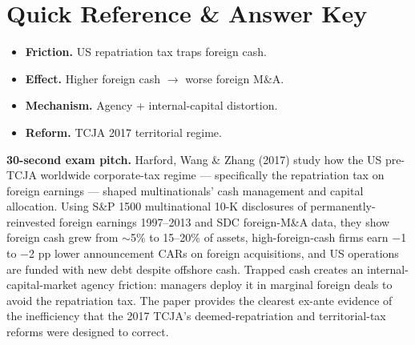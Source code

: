 \documentclass[11pt]{article}
\begin{document}
\section*{Quick Reference \& Answer Key}
\begin{answerbox}
\begin{itemize}
\item \textbf{Friction.} US repatriation tax traps foreign cash.
\item \textbf{Effect.} Higher foreign cash $\to$ worse foreign M\&A.
\item \textbf{Mechanism.} Agency + internal-capital distortion.
\item \textbf{Reform.} TCJA 2017 territorial regime.
\end{itemize}
\end{answerbox}

\begin{keybox}
\textbf{30-second exam pitch.} Harford, Wang \& Zhang (2017) study how the US pre-TCJA worldwide corporate-tax regime --- specifically the repatriation tax on foreign earnings --- shaped multinationals' cash management and capital allocation. Using S\&P 1500 multinational 10-K disclosures of permanently-reinvested foreign earnings 1997--2013 and SDC foreign-M\&A data, they show foreign cash grew from $\sim$5\% to 15--20\% of assets, high-foreign-cash firms earn $-$1 to $-$2 pp lower announcement CARs on foreign acquisitions, and US operations are funded with new debt despite offshore cash. Trapped cash creates an internal-capital-market agency friction: managers deploy it in marginal foreign deals to avoid the repatriation tax. The paper provides the clearest ex-ante evidence of the inefficiency that the 2017 TCJA's deemed-repatriation and territorial-tax reforms were designed to correct.
\end{keybox}
\end{document}
